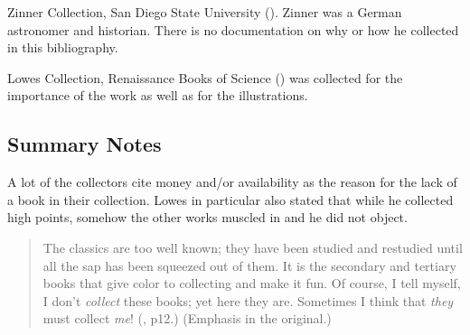 \documentclass[letterpaper]{article}
\begin{document}
Zinner Collection, San Diego State University (\cite{Kenny1988}). Zinner
was a German astronomer and historian.  There is no documentation
on why or how he collected in this bibliography.

Lowes Collection, Renaissance Books of Science (\cite{Godine1970})
was collected for the importance of the work as well as for the
illustrations.

\subsection{Summary Notes}

A lot of the collectors cite money and/or availability as the reason
for the lack of a book in their collection.  Lowes in particular also
stated that while he collected high points, somehow the other works
muscled in and he did not object.

\begin{quotation}
The classics are too well known; they have been studied and restudied
until all the sap has been squeezed out of them. It is the secondary
and tertiary books that give color to collecting and make it fun.  Of
course, I tell myself, I don't {\itshape collect} these books; yet
here they are. Sometimes I think that {\itshape they} must collect
{\itshape me}\thinspace! (\cite{Godine1970}, p12.) (Emphasis in the
original.)
\end{quotation}

\printbibliography
\end{document}
